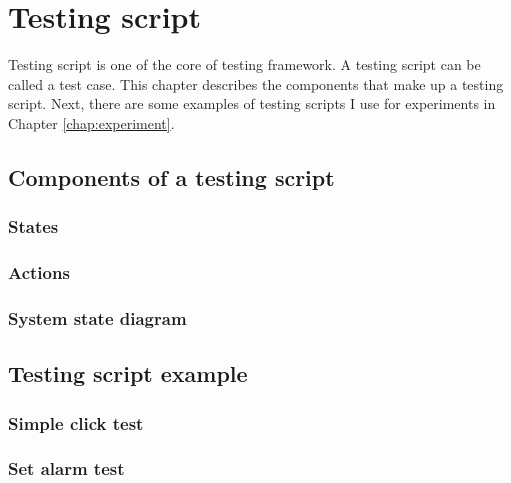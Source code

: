 \chapter{Testing script}
Testing script is one of the core of testing framework.
A testing script can be called a test case.
This chapter describes the components that make up a testing script. Next, there are some examples of testing scripts I use for experiments in Chapter \ref{chap:experiment}.

\section{Components of a testing script}
\subsection{States}

\subsection{Actions}

\subsection{System state diagram}

\section{Testing script example}
\subsection{Simple click test}

\subsection{Set alarm test}